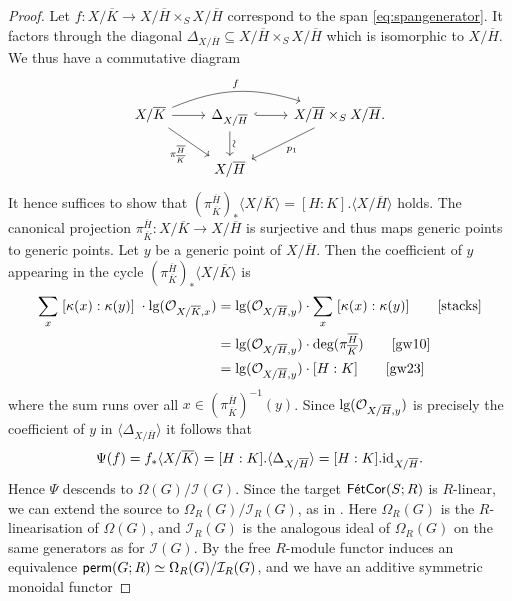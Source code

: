 \documentclass[reqno]{amsart}
\numberwithin{equation}{section}\theoremstyle{thms}
\theoremstyle{defn}
\newcommand{\cI}{\mathcal{I}}
\newcommand{\cO}{\mathcal{O}}
\newcommand{\tn}[1]{\textnormal{#1}}
\newcommand{\tsf}[1]{\textsf{\textup{#1}}}
\newcommand{\overl}[1]{\overline{#1}}
\newcommand{\permgr}{\tsf{perm}(G;R)}
\newcommand{\corfets}[1]{\tsf{FétCor}(S;#1)}
\begin{document}
\begin{proof}
Let $f: X/\overl{K} \to X/\overl{H} \times_S X/\overl{H}$ correspond to the span \ref{eq:spangenerator}. It factors through the diagonal $\Delta_{X/\overl{H}} \subseteq X/\overl{H} \times_S X/\overl{H}$ which is isomorphic to $X/\overl{H}$. We thus have a commutative diagram
\[\begin{tikzcd}
	{X/\overl{K}} & {\Delta_{X/\overl{H}}} & {X/\overl{H} \times_S X/\overl{H}.} \\
	& {X/\overl{H}}
	\arrow[from=1-1, to=1-2]
	\arrow["f", bend left=20, from=1-1, to=1-3]
	\arrow[from=1-1, to=2-2, "\pi^{\overl{H}}_{\overl{K}}"']
	\arrow[hook, from=1-2, to=1-3]
	\arrow[from=1-2, to=2-2, "\hspace*{-0.01cm}\rotatebox{90}{$\sim$}"]
	\arrow[from=1-3, to=2-2, "p_1"]
\end{tikzcd}\]
It hence suffices to show that $(\pi^{\overl{H}}_{\overl{K}})_*\langle X/\overl{K} \rangle = [H:K] . \langle X/\overl{H} \rangle$ holds. The canonical projection $\pi^{\overl{H}}_{\overl{K}}: X/\overl{K} \to X/\overl{H}$ is surjective and thus maps generic points to generic points. Let $y$ be a generic point of $X/\overl{H}$. Then the coefficient of $y$ appearing in the cycle $(\pi^{\overl{H}}_{\overl{K}})_*\langle X/\overl{K} \rangle$ is 
\begin{align*}
\sum_{x} \; [\kappa(x) : \kappa(y)] \; \cdot \tn{lg}(\cO_{X/\overl{K},x}) &= \tn{lg}(\cO_{X/\overl{H},y}) \cdot \sum_{x} \; [\kappa(x) : \kappa(y)] \tag*{\cite[{}10.52.13]{stacks}} \\
&= \tn{lg}(\cO_{X/\overl{H},y}) \cdot \tn{deg}(\pi^{\overl{H}}_{\overl{K}}) \tag*{\cite[Prop. 12.21]{gw10}}\\
&= \tn{lg}(\cO_{X/\overl{H},y}) \cdot [H:K] \tag*{\cite[Prop. 20.89]{gw23}}
\end{align*}
where the sum runs over all $x \in (\pi^{\overl{H}}_{\overl{K}})^{-1}(y)$. Since $\tn{lg}(\cO_{X/\overl{H},y})$ is precisely the coefficient of $y$ in $\langle \Delta_{X/\overl{H}} \rangle$ it follows that
$$\Psi(f) = f_* \langle X/\overl{K} \rangle = [H:K] . \langle \Delta_{X/\overl{H}} \rangle = [H:K] . \tn{id}_{X/\overl{H}}.$$
Hence $\Psi$ descends to $\Omega(G)/\cI(G)$. Since the target $\corfets{R}$ is $R$-linear, we can extend the source to $\Omega_R(G)/\cI_R(G)$, as in \cite[Corollary 4.21]{bg23}. Here $\Omega_R(G)$ is the $R$-linearisation of $\Omega(G)$, and $\cI_R(G)$ is the analogous ideal of $\Omega_R(G)$ on the same generators as for $\cI(G)$. By \cite[Proposition 4.17]{bg23} the free $R$-module functor induces an equivalence $\permgr \simeq \Omega_R(G)/\cI_R(G)$, and we have an additive symmetric monoidal functor

\end{proof}
\end{document}
